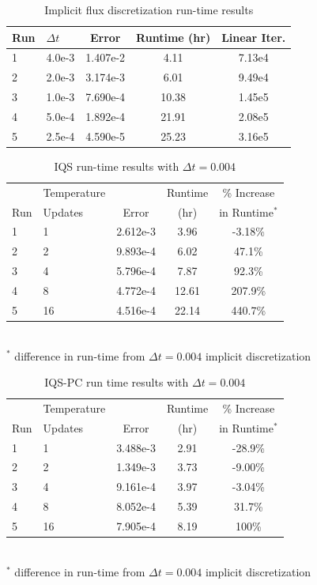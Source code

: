 \documentclass{elsarticle}
\newcommand{\iqspc}{IQS-PC\xspace}
\begin{document}
\begin{table}[!htbp]
\begin{center}
\caption{Implicit flux discretization run-time results}
\label{tab:ndiff_lra}
\begin{tabular}{|l|l|ccc|}
\hline
Run  &  $\Delta t$ & Error & Runtime (hr) & Linear Iter.\\
\hline
1	& 4.0e-3	& 1.407e-2 	& 4.11	& 7.13e4	\\
2	& 2.0e-3	& 3.174e-3 	& 6.01	& 9.49e4 	\\
3 	& 1.0e-3 	& 7.690e-4 	& 10.38	& 1.45e5	\\
4 	& 5.0e-4 	& 1.892e-4 	& 21.91	& 2.08e5	\\
5 	& 2.5e-4	& 4.590e-5 	& 25.23	& 3.16e5	\\
\hline
\end{tabular}
\end{center}
\end{table}

\begin{table}[!htbp]
\begin{center}
\caption{IQS run-time results with $\Delta t = 0.004$}
\label{tab:iqs_lra}
\begin{tabular}{|l|l|ccc|}
\hline
	&  Temperature 	&  		& Runtime 	& \% Increase	\\
Run	&  Updates 	& Error & (hr)		& in Runtime$^*$\\
\hline
1	& 1		& 2.612e-3 	& 3.96 	& -3.18\%	\\
2	& 2		& 9.893e-4 	& 6.02	&  47.1\%	\\
3 	& 4 	& 5.796e-4 	& 7.87	&  92.3\%	\\
4 	& 8 	& 4.772e-4 	& 12.61	& 207.9\% 	\\
5 	& 16	& 4.516e-4 	& 22.14	& 440.7\%	\\
\hline
\end{tabular}
\\
$^*$ difference in run-time from $\Delta t = 0.004$ implicit discretization 
\end{center}
\end{table}

\begin{table}[!htbp]
\begin{center}
\caption{\iqspc run time results with $\Delta t = 0.004$}
\label{tab:iqspc_lra}
\begin{tabular}{|l|l|ccc|}
\hline
	&  Temperature 	&  		& Runtime 	& \% Increase	\\
Run	&  Updates 	& Error & (hr)		& in Runtime$^*$\\
\hline
1	& 1		& 3.488e-3 	& 2.91 	& -28.9\%	\\
2	& 2		& 1.349e-3 	& 3.73	& -9.00\%	\\
3 	& 4 	& 9.161e-4 	& 3.97	& -3.04\%	\\
4 	& 8 	& 8.052e-4 	& 5.39	&  31.7\%	\\
5 	& 16	& 7.905e-4 	& 8.19	&  100\%	\\
\hline
\end{tabular}
\\
$^*$ difference in run-time from $\Delta t = 0.004$ implicit discretization 
\end{center}
\end{table}
\end{document}
